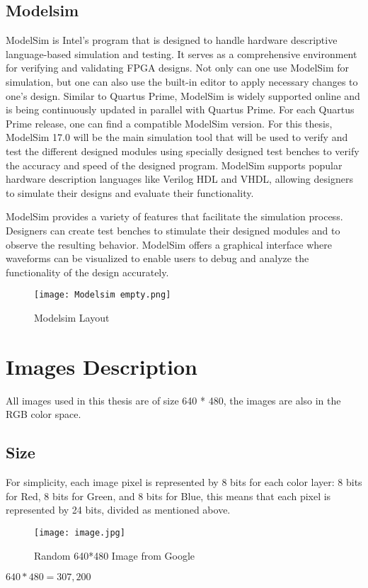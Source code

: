 \subsection{Modelsim}
\par ModelSim is Intel's program that is designed to handle hardware descriptive language-based simulation and testing. It serves as a comprehensive environment for verifying and validating FPGA designs. Not only can one use ModelSim for simulation, but one can also use the built-in editor to apply necessary changes to one's design. Similar to Quartus Prime, ModelSim is widely supported online and is being continuously updated in parallel with Quartus Prime. For each Quartus Prime release, one can find a compatible ModelSim version. For this thesis, ModelSim 17.0 will be the main simulation tool that will be used to verify and test the different designed modules using specially designed test benches to verify the accuracy and speed of the designed program. ModelSim supports popular hardware description languages like Verilog HDL and VHDL, allowing designers to simulate their designs and evaluate their functionality. \newline
\par ModelSim provides a variety of features that facilitate the simulation process. Designers can create test benches to stimulate their designed modules and to observe the resulting behavior. ModelSim offers a graphical interface where waveforms can be visualized to enable users to debug and analyze the functionality of the design accurately.  \newline

\begin{figure}[H]
    \centering
    \texttt{[image: Modelsim empty.png]}
    \caption{Modelsim Layout}
    \label{fig:EmptyModelsim}  
\end{figure}

\section{Images Description}
\par All images used in this thesis are of size 640 * 480,  the images are also in the RGB color space. \newline

\subsection{Size}
\par  For simplicity, each image pixel is represented by 8 bits for each color layer: 8 bits for Red, 8 bits for Green, and 8 bits for Blue, this means that each pixel is represented by 24 bits, divided as mentioned above. \newline
\begin{figure}[H]
    \centering
    \texttt{[image: image.jpg]}
    \caption{Random 640*480 Image from Google \cite{figfive}}
    \label{fig:640480image}  
\end{figure}
\begin{math}
    640 * 480 = 307,200             
\end{math}

